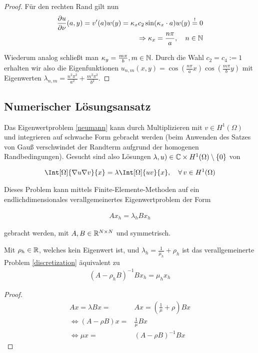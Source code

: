 \documentclass{article}
\begin{document}
\begin{proof}
	Für den rechten Rand gilt nun
	\begin{align*}
		\frac{\partial u}{\partial \nu}(a,y) = v'(a)w(y) = \kappa_{x} c_2 \sin(\kappa_{x} \cdot a)w(y) \stackrel{!}{=} 0 \\
		\Rightarrow \kappa_x = \frac{n \pi}{a}, \quad n \in \mathbb{N}
	\end{align*}

	Wiederum analog schließt man $\kappa_y = \frac{m \pi}{b}, m \in \mathbb{N}$. Durch die Wahl $c_2 = c_4 := 1$ erhalten wir also die Eigenfunktionen $u_{n,m}(x,y) = \cos(\frac{n \pi}{a}x)\cos(\frac{m \pi}{b}y)$ mit Eigenwerten $\lambda_{n,m} = \frac{n^2 \pi^2}{a^2} + \frac{m^2 \pi^2}{b^2}$.
\end{proof}

\subsection{Numerischer Lösungsansatz}

Das Eigenwertproblem \ref{neumann} kann durch Multiplizieren mit $v \in H^1(\Omega)$ und integrieren auf schwache Form gebracht werden (beim Anwenden des Satzes von Gauß verschwindet der Randterm aufgrund der homogenen Randbedingungen). Gesucht sind also Lösungen $\lambda, u) \in \mathbb{C} \times H^1(\Omega) \setminus \{0\}$ von

\begin{align*}
	\Int[\Omega]{\nabla u \nabla v}{x} = \lambda \Int[\Omega]{uv}{x}, \quad \Forall v \in H^1(\Omega)
\end{align*}

Dieses Problem kann mittels Finite-Elemente-Methoden auf ein endlichdimensionales verallgemeinertes Eigenwertproblem der Form

\begin{align} \label{discretization}
	A x_h = \lambda_h B x_h
\end{align}

gebracht werden, mit $A, B \in \mathbb{R}^{N \times N}$ und symmetrisch.

\begin{lemma}
	Mit $\rho_h \in \mathbb{R}$, welches kein Eigenwert ist, und $\lambda_h = \frac{1}{\mu_h} + \rho_h$ ist das verallgemeinerte Problem \ref{discretization} äquivalent  zu
	\begin{align} \label{equivdiscret}
		(A - \rho_h B)^{-1} B x_h = \mu_h x_h
	\end{align}
\end{lemma}

\begin{proof}
	\begin{align*}
		A x = \lambda B x =& A x = (\frac{1}{\mu} + \rho) B x \\
		\Leftrightarrow (A - \rho B)x =& \frac{1}{\mu} B x \\
		\Leftrightarrow \mu x =& (A - \rho B)^{-1}B x
	\end{align*}
\end{proof}
\end{document}
